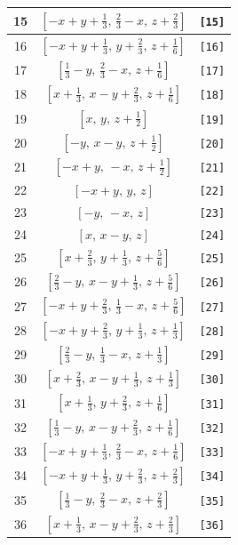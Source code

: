 \documentclass[fleqn,8pt]{jsarticle}
\begin{document}
\begin{longtable}{ccc}
15 & $\left[ - x + y + \frac{1}{3},\, \frac{2}{3} - x,\, z + \frac{2}{3} \right]$ & {\tt [15]} \\ \hline
16 & $\left[ - x + y + \frac{1}{3},\, y + \frac{2}{3},\, z + \frac{1}{6} \right]$ & {\tt [16]} \\ \hline
17 & $\left[ \frac{1}{3} - y,\, \frac{2}{3} - x,\, z + \frac{1}{6} \right]$ & {\tt [17]} \\ \hline
18 & $\left[ x + \frac{1}{3},\, x - y + \frac{2}{3},\, z + \frac{1}{6} \right]$ & {\tt [18]} \\ \hline
19 & $\left[ x,\, y,\, z + \frac{1}{2} \right]$ & {\tt [19]} \\ \hline
20 & $\left[ - y,\, x - y,\, z + \frac{1}{2} \right]$ & {\tt [20]} \\ \hline
21 & $\left[ - x + y,\, - x,\, z + \frac{1}{2} \right]$ & {\tt [21]} \\ \hline
22 & $\left[ - x + y,\, y,\, z \right]$ & {\tt [22]} \\ \hline
23 & $\left[ - y,\, - x,\, z \right]$ & {\tt [23]} \\ \hline
24 & $\left[ x,\, x - y,\, z \right]$ & {\tt [24]} \\ \hline
25 & $\left[ x + \frac{2}{3},\, y + \frac{1}{3},\, z + \frac{5}{6} \right]$ & {\tt [25]} \\ \hline
26 & $\left[ \frac{2}{3} - y,\, x - y + \frac{1}{3},\, z + \frac{5}{6} \right]$ & {\tt [26]} \\ \hline
27 & $\left[ - x + y + \frac{2}{3},\, \frac{1}{3} - x,\, z + \frac{5}{6} \right]$ & {\tt [27]} \\ \hline
28 & $\left[ - x + y + \frac{2}{3},\, y + \frac{1}{3},\, z + \frac{1}{3} \right]$ & {\tt [28]} \\ \hline
29 & $\left[ \frac{2}{3} - y,\, \frac{1}{3} - x,\, z + \frac{1}{3} \right]$ & {\tt [29]} \\ \hline
30 & $\left[ x + \frac{2}{3},\, x - y + \frac{1}{3},\, z + \frac{1}{3} \right]$ & {\tt [30]} \\ \hline
31 & $\left[ x + \frac{1}{3},\, y + \frac{2}{3},\, z + \frac{1}{6} \right]$ & {\tt [31]} \\ \hline
32 & $\left[ \frac{1}{3} - y,\, x - y + \frac{2}{3},\, z + \frac{1}{6} \right]$ & {\tt [32]} \\ \hline
33 & $\left[ - x + y + \frac{1}{3},\, \frac{2}{3} - x,\, z + \frac{1}{6} \right]$ & {\tt [33]} \\ \hline
34 & $\left[ - x + y + \frac{1}{3},\, y + \frac{2}{3},\, z + \frac{2}{3} \right]$ & {\tt [34]} \\ \hline
35 & $\left[ \frac{1}{3} - y,\, \frac{2}{3} - x,\, z + \frac{2}{3} \right]$ & {\tt [35]} \\ \hline
36 & $\left[ x + \frac{1}{3},\, x - y + \frac{2}{3},\, z + \frac{2}{3} \right]$ & {\tt [36]} \\
\end{longtable}
\end{document}
